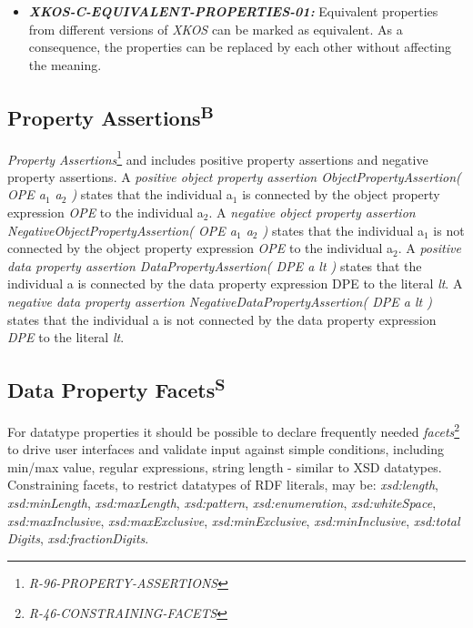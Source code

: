 \documentclass{llncs}
\begin{document}
\begin{itemize}
	\item \textbf{{\em XKOS-C-EQUIVALENT-PROPERTIES-01:}}
	Equivalent properties from different versions of \emph{XKOS} can be marked as equivalent. 
	As a consequence, the properties can be replaced by each other without affecting the meaning.
\end{itemize}

\subsection{Property Assertions\textsuperscript{B}}

\emph{{Property Assertions}}\footnote{\emph{R-96-PROPERTY-ASSERTIONS}}
and includes positive property assertions and negative property assertions.
A \emph{positive object property assertion ObjectPropertyAssertion( OPE a$_1$ a$_2$ )} states that the individual a$_1$ is connected by the object property expression \emph{OPE} to the individual a$_2$. 
A \emph{negative object property assertion NegativeObjectPropertyAssertion( OPE a$_1$ a$_2$ )} states that the individual a$_1$ is not connected by the object property expression \emph{OPE} to the individual a$_2$. 
A \emph{positive data property assertion DataPropertyAssertion( DPE a lt )} states that the individual a is connected by the data property expression DPE to the literal \emph{lt}. 
A \emph{negative data property assertion NegativeDataPropertyAssertion( DPE a lt )} states that the individual a is not connected by the data property expression \emph{DPE} to the literal \emph{lt}.

\subsection{Data Property Facets\textsuperscript{S}}

For datatype properties it should be possible to declare frequently needed \emph{facets}\footnote{\emph{R-46-CONSTRAINING-FACETS}} to drive user interfaces and validate input against simple conditions, including min/max value, regular expressions, string length - similar to XSD datatypes. 
Constraining facets, to restrict datatypes of RDF literals, may be: \emph{xsd:length}, \emph{xsd:minLength}, \emph{xsd:maxLength}, \emph{xsd:pattern}, \emph{xsd:enumeration}, \emph{xsd:whiteSpace}, \\ \emph{xsd:maxInclusive}, \emph{xsd:maxExclusive}, \emph{xsd:minExclusive}, \emph{xsd:minInclusive}, \emph{xsd:total} \emph{Digits}, \emph{xsd:fractionDigits}.
\end{document}
